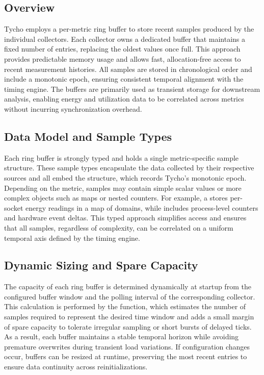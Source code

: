 \subsection{Overview}
\label{subsec:ringbuffer_overview}

Tycho employs a per-metric ring buffer to store recent samples produced by the individual collectors.  
Each collector owns a dedicated buffer that maintains a fixed number of entries, replacing the oldest values once full.  
This approach provides predictable memory usage and allows fast, allocation-free access to recent measurement histories.  
All samples are stored in chronological order and include a monotonic epoch, ensuring consistent temporal alignment with the timing engine.  
The buffers are primarily used as transient storage for downstream analysis, enabling energy and utilization data to be correlated across metrics without incurring synchronization overhead.

\subsection{Data Model and Sample Types}
\label{subsec:ringbuffer_samples}

Each ring buffer is strongly typed and holds a single metric-specific sample structure.  
These sample types encapsulate the data collected by their respective sources and all embed the  structure, which records Tycho’s monotonic epoch.  
Depending on the metric, samples may contain simple scalar values or more complex objects such as maps or nested counters.  
For example, a  stores per-socket energy readings in a map of domains, while  includes process-level counters and hardware event deltas.  
This typed approach simplifies access and ensures that all samples, regardless of complexity, can be correlated on a uniform temporal axis defined by the timing engine.

\subsection{Dynamic Sizing and Spare Capacity}
\label{subsec:ringbuffer_sizing}

The capacity of each ring buffer is determined dynamically at startup from the configured buffer window and the polling interval of the corresponding collector.  
This calculation is performed by the  function, which estimates the number of samples required to represent the desired time window and adds a small margin of spare capacity to tolerate irregular sampling or short bursts of delayed ticks.  
As a result, each buffer maintains a stable temporal horizon while avoiding premature overwrites during transient load variations.  
If configuration changes occur, buffers can be resized at runtime, preserving the most recent entries to ensure data continuity across reinitializations.

